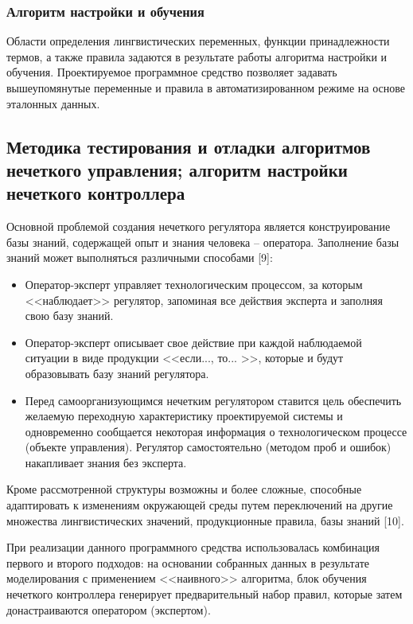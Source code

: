 \subsubsection{ Алгоритм настройки и обучения }

Области определения лингвистических переменных, функции принадлежности термов, а также правила задаются в результате работы алгоритма настройки и обучения. Проектируемое программное средство позволяет задавать вышеупомянутые переменные и правила в автоматизированном режиме на основе эталонных данных.

\subsection{Методика тестирования и отладки алгоритмов нечеткого управления; алгоритм настройки нечеткого контроллера}

Основной проблемой создания нечеткого регулятора является конструирование базы знаний, содержащей опыт и знания человека – оператора. Заполнение базы знаний может выполняться различными способами [9]:

\begin{itemize}
  \item Оператор-эксперт управляет технологическим процессом, за которым <<наблюдает>> регулятор, запоминая все действия эксперта и заполняя свою базу знаний.
  \item Оператор-эксперт описывает свое действие при каждой наблюдаемой ситуации в виде продукции <<если..., то... >>, которые и будут образовывать базу знаний регулятора.
  \item Перед самоорганизующимся нечетким регулятором ставится цель обеспечить желаемую переходную характеристику проектируемой системы и одновременно сообщается некоторая информация о технологическом процессе (объекте управления). Регулятор самостоятельно (методом проб и ошибок) накапливает знания без эксперта.
\end{itemize}

Кроме рассмотренной структуры возможны и более сложные, способные адаптировать к изменениям окружающей среды путем переключений на другие множества лингвистических значений, продукционные правила, базы знаний [10].

При реализации данного программного средства использовалась комбинация первого и второго подходов: на основании собранных данных в результате моделирования с применением <<наивного>> алгоритма, блок обучения нечеткого контроллера генерирует предварительный набор правил, которые затем донастраиваются оператором (экспертом).

